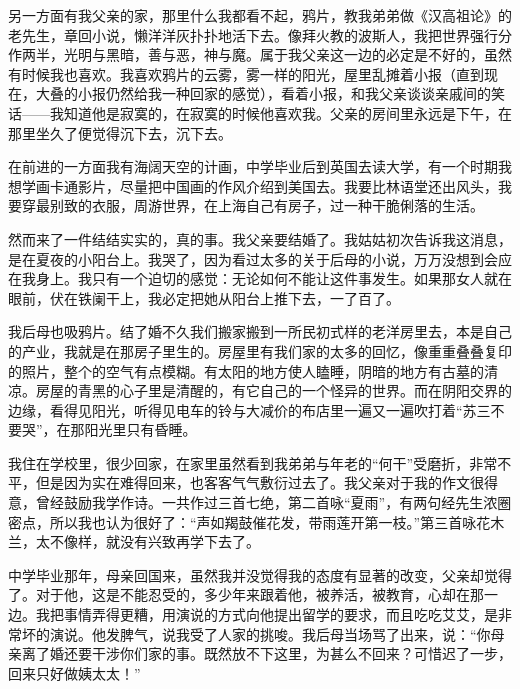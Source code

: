 \par 另一方面有我父亲的家，那里什么我都看不起，鸦片，教我弟弟做《汉高祖论》的老先生，章回小说，懒洋洋灰扑扑地活下去。像拜火教的波斯人，我把世界强行分作两半，光明与黑暗，善与恶，神与魔。属于我父亲这一边的必定是不好的，虽然有时候我也喜欢。我喜欢鸦片的云雾，雾一样的阳光，屋里乱摊着小报（直到现在，大叠的小报仍然给我一种回家的感觉），看着小报，和我父亲谈谈亲戚间的笑话——我知道他是寂寞的，在寂寞的时候他喜欢我。父亲的房间里永远是下午，在那里坐久了便觉得沉下去，沉下去。
\par 在前进的一方面我有海阔天空的计画，中学毕业后到英国去读大学，有一个时期我想学画卡通影片，尽量把中国画的作风介绍到美国去。我要比林语堂还出风头，我要穿最别致的衣服，周游世界，在上海自己有房子，过一种干脆俐落的生活。
\par 然而来了一件结结实实的，真的事。我父亲要结婚了。我姑姑初次告诉我这消息，是在夏夜的小阳台上。我哭了，因为看过太多的关于后母的小说，万万没想到会应在我身上。我只有一个迫切的感觉：无论如何不能让这件事发生。如果那女人就在眼前，伏在铁阑干上，我必定把她从阳台上推下去，一了百了。
\par 我后母也吸鸦片。结了婚不久我们搬家搬到一所民初式样的老洋房里去，本是自己的产业，我就是在那房子里生的。房屋里有我们家的太多的回忆，像重重叠叠复印的照片，整个的空气有点模糊。有太阳的地方使人瞌睡，阴暗的地方有古墓的清凉。房屋的青黑的心子里是清醒的，有它自己的一个怪异的世界。而在阴阳交界的边缘，看得见阳光，听得见电车的铃与大减价的布店里一遍又一遍吹打着“苏三不要哭”，在那阳光里只有昏睡。
\par 我住在学校里，很少回家，在家里虽然看到我弟弟与年老的“何干”受磨折，非常不平，但是因为实在难得回来，也客客气气敷衍过去了。我父亲对于我的作文很得意，曾经鼓励我学作诗。一共作过三首七绝，第二首咏“夏雨”，有两句经先生浓圈密点，所以我也认为很好了：“声如羯鼓催花发，带雨莲开第一枝。”第三首咏花木兰，太不像样，就没有兴致再学下去了。
\par 中学毕业那年，母亲回国来，虽然我并没觉得我的态度有显著的改变，父亲却觉得了。对于他，这是不能忍受的，多少年来跟着他，被养活，被教育，心却在那一边。我把事情弄得更糟，用演说的方式向他提出留学的要求，而且吃吃艾艾，是非常坏的演说。他发脾气，说我受了人家的挑唆。我后母当场骂了出来，说：“你母亲离了婚还要干涉你们家的事。既然放不下这里，为甚么不回来？可惜迟了一步，回来只好做姨太太！”
